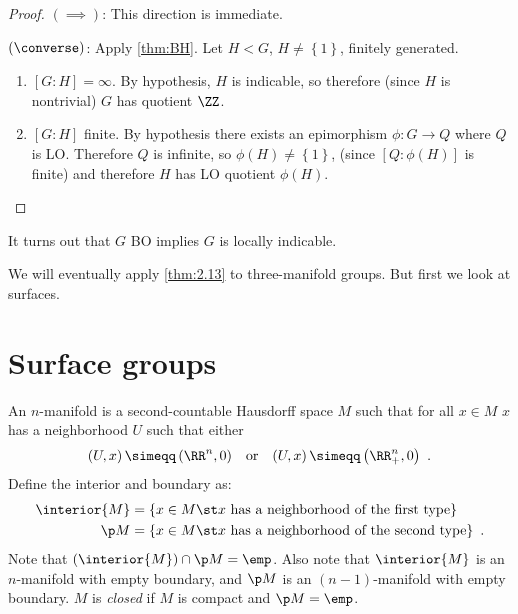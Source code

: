 
\begin{proof}
$\left(\implies\right)$: This direction is immediate. 

$\left(\converse\right)$: Apply \cref{thm:BH}. Let $H < G$, $H\neq \left\{1\right\}$,
finitely generated. 
\begin{enumerate}[label = Case \numbers:]
\item $\left[G : H\right] = \infty$. By hypothesis, $H$
is indicable, so therefore (since $H$ is nontrivial) $G$ has quotient $\ZZ$.

\item $\left[G : H\right]$ finite. By hypothesis there exists an epimorphism $\phi :G\to
Q$ where $Q$ is LO. Therefore $Q$ is infinite, so $\phi\left(H\right)\neq
\left\{1\right\}$, 
(since $\left[Q : \phi\left(H\right)\right]$ is finite) and therefore $H$ has LO quotient
$\phi\left(H\right)$.
\end{enumerate}
\end{proof}

\begin{rmk}
It turns out that $G$ BO implies $G$ is locally indicable.
\end{rmk}

\begin{rmk}
We will eventually apply \cref{thm:2.13} to three-manifold groups.
But first we look at surfaces.
\end{rmk}

\section{Surface groups}

An $n$-manifold is a second-countable Hausdorff space $M$
such that for all $x\in M$ $x$ has a neighborhood $U$ such that 
either 
\begin{align*}
\left(U , x\right) \simeqq \left(\RR^n , 0\right)
&& \text{or} &&
\left(U , x\right) \simeqq \left(\RR^n_+ , 0\right) \ .
\end{align*}
Define the interior and boundary as:
\begin{align*}
\interior{M} &= \left\{x\in M \st x \text{ has a neighborhood of the first type}\right\}
\\
\p M &= \left\{x\in M \st x \text{ has a neighborhood of the second type}\right\}
\ .
\end{align*}
Note that $\left(\interior{M}\right) \cap \p M = \emp$.
Also  note that $\interior{M}$ is an $n$-manifold with empty boundary, and $\p M$ is an
$\left(n-1\right)$-manifold with empty boundary.
$M$ is \emph{closed} if $M$ is compact and $\p M = \emp$.


